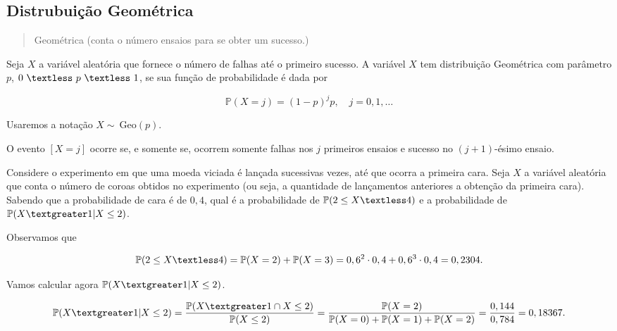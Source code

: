 \documentclass[10pt,a4paper]{article}
\begin{document}
\subsection{Distrubuição Geométrica}
\begin{quote}
	Geométrica (conta o número ensaios para se obter um sucesso.)
\end{quote}
\begin{df}
	Seja $ X $ a variável aleatória que fornece o número de falhas até o primeiro sucesso. A variável $ X $ tem distribuição Geométrica com parâmetro $ p $, $ 0 \ \textless \ p \ \textless \ 1 $, se sua função de probabilidade é dada por


\[\mathbb{P}\left(X=j\right)=(1-p)^jp, \quad j=0,1,\ldots\] 	

 

Usaremos a notação $ X \sim \ \text{Geo}(p) $.

O evento $ [X=j] $ ocorre se, e somente se, ocorrem somente falhas nos $ j $ primeiros ensaios e sucesso no $ (j+1) $-ésimo ensaio.
\end{df}

\begin{eg}
	Considere o experimento em que uma moeda viciada é lançada sucessivas vezes, até que ocorra a primeira cara. Seja $ X $ a variável aleatória que conta o número de coroas obtidos no experimento (ou seja, a quantidade de lançamentos anteriores a obtenção da primeira cara). Sabendo que a probabilidade de cara é de $ 0,4 $, qual é a probabilidade de $ \mathbb{P}(2\leq X\textless 4) $ e a probabilidade de $ \mathbb{P}(X\textgreater 1| X\leq 2) $.
\end{eg}

\begin{sol}
Observamos que

\[\mathbb{P}(2\leq X\textless 4)=\mathbb{P}(X=2)+\mathbb{P}(X=3)=0,6^2\cdot 0,4+0,6^3\cdot 0,4=0,2304.\] 	

Vamos calcular agora $ \mathbb{P}(X\textgreater 1| X\leq 2) $.

\[\mathbb{P}(X\textgreater 1| X\leq 2)=\frac{\mathbb{P}(X\textgreater 1\cap X\leq 2)}{\mathbb{P}(X\leq2)}=\frac{\mathbb{P}(X=2)}{\mathbb{P}(X=0)+\mathbb{P}(X=1)+\mathbb{P}(X=2)}=\frac{0,144}{0,784}=0,18367.\]
\end{sol}
\end{document}
